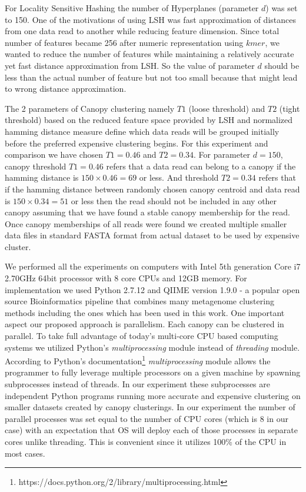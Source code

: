 \documentclass[10pt, conference, compsocconf]{IEEEtran}
\begin{document}
For Locality Sensitive Hashing the number of Hyperplanes (parameter $d$) was set to 150. One of the motivations of using LSH was fast approximation of distances from one data read to another while reducing feature dimension. Since total number of features became 256 after numeric representation using $kmer$, we wanted to reduce the number of features while maintaining a relatively accurate yet fast distance approximation from LSH. So the value of parameter $d$ should be less than the actual number of feature but not too small because that might lead to wrong distance approximation.

The 2 parameters of Canopy clustering namely $T1$ (loose threshold) and $T2$ (tight threshold) based on the reduced feature space provided by LSH and normalized hamming distance measure define which data reads will be grouped initially before the preferred expensive clustering begins. For this experiment and comparison we have chosen $T1=0.46$ and $T2=0.34$. For parameter $d=150$, canopy threshold $T1=0.46$ refers that a data read can belong to a canopy if the hamming distance is $150\times0.46=69$ or less. And threshold $T2=0.34$ refers that if the hamming distance between randomly chosen canopy centroid and data read is $150\times0.34=51$ or less then the read should not be included in any other canopy assuming that we have found a stable canopy membership for the read. Once canopy memberships of all reads were found we created multiple smaller data files in standard FASTA format from actual dataset to be used by expensive cluster.          

We performed all the experiments on computers with Intel 5th generation Core i7 2.70GHz 64bit processor with 8 core CPUs and 12GB memory. For implementation we used Python 2.7.12 and QIIME \cite{MARQiime} version 1.9.0 - a popular open source Bioinformatics pipeline that combines many metagenome clustering methods including the ones which has been used in this work. One important aspect our proposed approach is parallelism. Each canopy can be clustered in parallel. To take full advantage of today's multi-core CPU based computing systems we utilized Python's \textit{multiprocessing} module instead of \textit{threading} module. According to Python's documentation\footnote{https://docs.python.org/2/library/multiprocessing.html} \textit{multiprocessing} module allows the programmer to fully leverage multiple processors on a given machine by spawning subprocesses instead of threads. In our experiment these subprocesses are independent Python programs running more accurate and expensive clustering on smaller datasets created by canopy clusterings. In our experiment the number of parallel processes was set equal to the number of CPU cores (which is 8 in our case) with an expectation that OS will deploy each of those processes in separate cores unlike threading. This is convenient since it utilizes 100\% of the CPU in most cases. 
\end{document}
